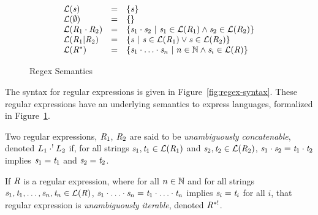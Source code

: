 \documentclass[numbers]{sigplanconf}
\begin{document}
\begin{figure}
\[
\begin{array}{lcl}
\mathcal{L}(\mathit{s}) &=& \{\mathit{s}\}\\
\mathcal{L}(\emptyset) &=& \{\}\\
\mathcal{L}(\mathit{R}_1\cdot\mathit{R}_2) &=&
\{\mathit{s}_1\cdot\mathit{s}_2 ~|~
\mathit{s}_1\in\mathcal{L}(\mathit{R}_1) \wedge \mathit{s}_2\in\mathcal{L}(\mathit{R}_2)\}\\
\mathcal{L}(\mathit{R}_1|\mathit{R}_2) &=&
\{\mathit{s} ~|~
\mathit{s}\in\mathcal{L}(\mathit{R}_1) \vee \mathit{s}\in\mathcal{L}(\mathit{R}_2)\}\\
\mathcal{L}({\mathit{R}}^*) &=&
\{\mathit{s}_1\cdot\ldots\cdot\mathit{s}_n ~|~
n\in\mathbb{N} \wedge \mathit{s}_i\in\mathcal{L}(\mathit{R})\}
\end{array}
\]
\caption{Regex Semantics}
\label{fig:regex-semantics}
\end{figure}

The syntax for regular expressions is given in Figure~\ref{fig:regex-syntax}.
These regular expressions have an underlying semantics to express languages,
formalized in Figure~\ref{fig:regex-semantics}. 

Two regular expressions, $\mathit{R}_1$, $\mathit{R}_2$ are said to be 
\textit{unambiguously concatenable}, denoted
$L_1\cdot^!L_2$ if, 
for all strings $\mathit{s}_1,\mathit{t}_1\in\mathcal{L}(\mathit{R}_1)$ and
$\mathit{s}_2,\mathit{t}_2\in\mathcal{L}(\mathit{R}_2)$,
$\mathit{s}_1\cdot\mathit{s}_2=\mathit{t}_1\cdot\mathit{t}_2$ implies
$\mathit{s}_1=\mathit{t}_1$ and $\mathit{s}_2=\mathit{t}_2$.

If $\mathit{R}$ is a regular expression, where
for all $n\in\mathbb{N}$ and for all strings
$\mathit{s}_1,\mathit{t}_1,\ldots,\mathit{s}_n,\mathit{t}_n\in\mathcal{L}(\mathit{R})$,
$\mathit{s}_1\cdot\ldots\cdot\mathit{s}_n=\mathit{t}_1\cdot\ldots\cdot\mathit{t}_n$
implies $\mathit{s}_i=\mathit{t}_i$ for all $i$,
that regular expression is \textit{unambiguously iterable},
denoted $\mathit{R}^{*!}$.
\end{document}
